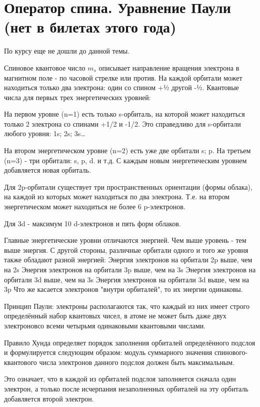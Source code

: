\newpage
\chapter{Оператор спина. Уравнение Паули (нет в билетах этого года)}
\par По курсу еще не дошли до данной темы.
\par Спиновое квантовое число $m_s$ описывает направление вращения электрона в магнитном поле - по часовой стрелке или против. На каждой орбитали может находиться только два электрона: один со спином +½ другой -½.
Квантовые числа для первых трех энергетических уровней:

На первом уровне (n=1) есть только s-орбиталь, на которой может находиться только 2 электрона со спинами +1/2 и -1/2. Это справедливо для s-орбитали любого уровня: 1s; 2s; 3s…

На втором энергетическом уровне (n=2) есть уже две орбитали s; p. 
На третьем (n=3) - три орбитали: s, p, d. и т.д. С каждым новым энергетическим уровнем добавляется новая орбиталь.

Для 2p-орбитали существует три пространственных ориентации (формы облака), на каждой из которых может находиться по два электрона. Т.е. на втором энергетическом может находиться не более 6 p-электронов.

Для 3d - максимум 10 d-электронов и пять форм облаков.

Главные энергетические уровни отличаются энергией. Чем выше уровень - тем выше энергия. С другой стороны, различные орбитали одного и того же уровня также обладают разной энергией:
Энергия электронов на орбитали 2p выше, чем на 2s
Энергия электронов на орбитали 3p выше, чем на 3s
Энергия электронов на орбитали 3d выше, чем на 3s
Энергия электронов на орбитали 3d выше, чем на 3p
Что же касается электронов "внутри орбиталей", то их энергии одинаковы.

\par Принцип Паули: электроны располагаются так, что каждый из них имеет строго определённый набор квантовых чисел, в атоме не может быть даже двух электроновсо всеми четырьмя одинаковыми квантовыми числами.

Правило Хунда определяет порядок заполнения орбиталей определённого подслоя и формулируется следующим образом: модуль суммарного значения спинового-квантового числа электронов данного подслоя должен быть максимальным.

Это означает, что в каждой из орбиталей подслоя заполняется сначала один электрон, а только после исчерпания незаполненных орбиталей на эту орбиталь добавляется второй электрон.
